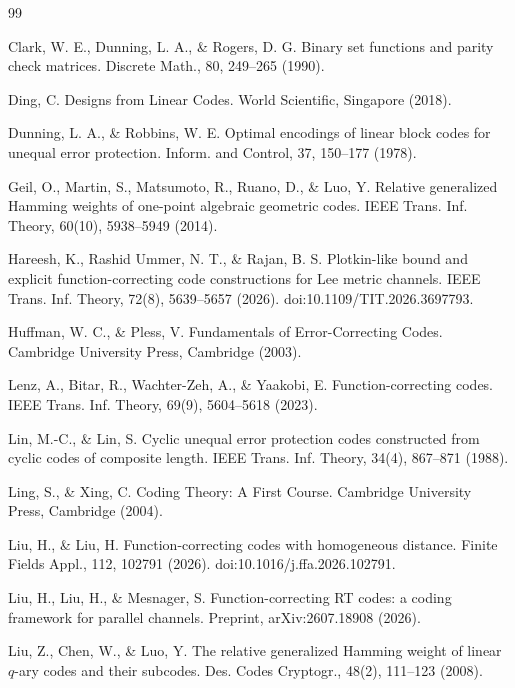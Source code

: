 \documentclass[a4paper,12pt]{article}
\theoremstyle{plain}
\theoremstyle{definition}
\begin{document}
\begin{thebibliography}{99}



Clark, W. E., Dunning, L. A., \& Rogers, D. G.
Binary set functions and parity check matrices.
Discrete Math., 80, 249--265 (1990).

Ding, C.
Designs from Linear Codes.
World Scientific, Singapore (2018).

Dunning, L. A., \& Robbins, W. E.
Optimal encodings of linear block codes for unequal error protection.
Inform. and Control, 37, 150--177 (1978).

Geil, O., Martin, S., Matsumoto, R., Ruano, D., \& Luo, Y.
Relative generalized Hamming weights of one-point algebraic geometric codes.
IEEE Trans. Inf. Theory, 60(10), 5938--5949 (2014).


Hareesh, K., Rashid Ummer, N. T., \& Rajan, B. S.
Plotkin-like bound and explicit function-correcting code constructions
for Lee metric channels.
IEEE Trans. Inf. Theory, 72(8), 5639--5657 (2026).
doi:10.1109/TIT.2026.3697793.

Huffman, W. C., \& Pless, V.
Fundamentals of Error-Correcting Codes.
Cambridge University Press, Cambridge (2003).


Lenz, A., Bitar, R., Wachter-Zeh, A., \& Yaakobi, E.
Function-correcting codes.
IEEE Trans. Inf. Theory, 69(9), 5604--5618 (2023).


Lin, M.-C., \& Lin, S.
Cyclic unequal error protection codes constructed from cyclic codes of composite length.
IEEE Trans. Inf. Theory, 34(4), 867--871 (1988).

Ling, S., \& Xing, C.
Coding Theory: A First Course.
Cambridge University Press, Cambridge (2004).

Liu, H., \& Liu, H.
Function-correcting codes with homogeneous distance.
Finite Fields Appl., 112, 102791 (2026).
doi:10.1016/j.ffa.2026.102791.

Liu, H., Liu, H., \& Mesnager, S.
Function-correcting RT codes: a coding framework for parallel channels.
Preprint, arXiv:2607.18908 (2026).

Liu, Z., Chen, W., \& Luo, Y.
The relative generalized Hamming weight of linear $q$-ary codes and their subcodes.
Des. Codes Cryptogr., 48(2), 111--123 (2008).


\end{thebibliography}
\end{document}
